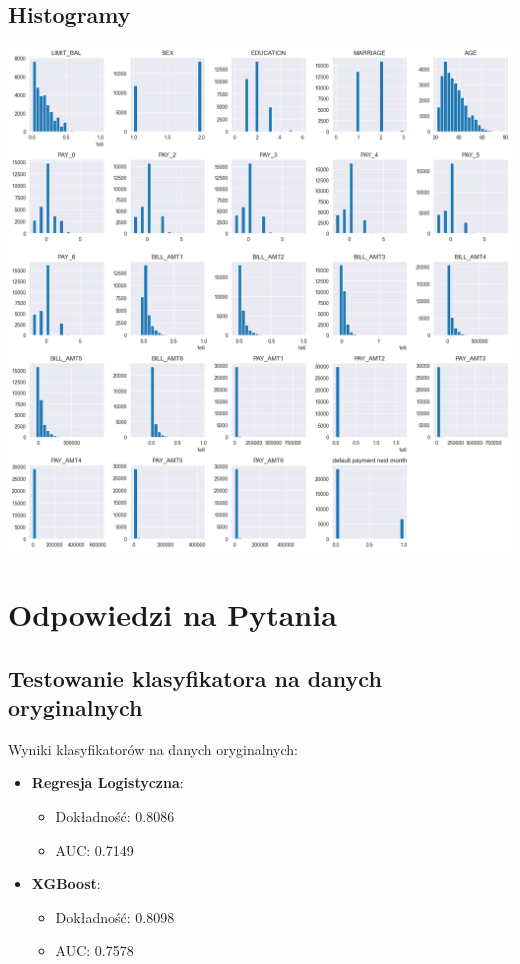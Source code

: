\documentclass{article}
\begin{document}
\subsection{Histogramy}
\includegraphics[width=1\textwidth]{./histogramy.png}

\section{Odpowiedzi na Pytania}

\subsection{Testowanie klasyfikatora na danych oryginalnych}

Wyniki klasyfikatorów na danych oryginalnych:

\begin{itemize}
    \item \textbf{Regresja Logistyczna}:
    \begin{itemize}
        \item Dokładność: 0.8086
        \item AUC: 0.7149
    \end{itemize}
    \item \textbf{XGBoost}:
    \begin{itemize}
        \item Dokładność: 0.8098
        \item AUC: 0.7578
    \end{itemize}
\end{itemize}
\end{document}
